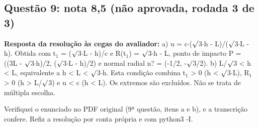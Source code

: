 \documentclass{article}%
\begin{document}
\subsection*{Questão 9: nota 8,5 (não aprovada, rodada 3 de 3)}%
\textbf{Resposta da resolução às cegas do avaliador:} a) u = c$\cdot$($\surd$3$\cdot$h - L)/($\surd$3$\cdot$L - h).\newline%
Obtida com t$_{1}$ = ($\surd$3$\cdot$L - h)/c e R(t$_{1}$) = $\surd$3$\cdot$h - L, ponto de impacto P = ((3L - $\surd$3$\cdot$h)/2, ($\surd$3$\cdot$L - h)/2) e normal radial n? = (-1/2, -$\surd$3/2).\newline%
\newline%
b) L/$\surd$3 < h < L, equivalente a h < L < $\surd$3$\cdot$h. Esta condição combina t$_{1}$ > 0 (h < $\surd$3$\cdot$L), R$_{1}$ > 0 (h > L/$\surd$3) e u < c (h < L). Os extremos são excluídos.\newline%
\newline%
Não se trata de múltipla escolha.\par %
Verifiquei o enunciado no PDF original (9ª questão, itens a e b), e a transcrição confere. Refiz a resolução por conta própria e com python3 {-}I.\newline%
\newline%
\end{document}
